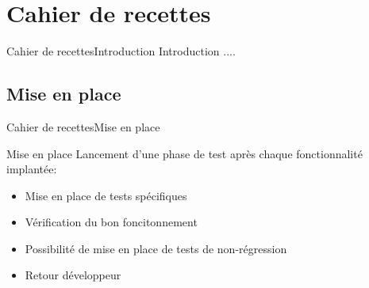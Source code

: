 \section{Cahier de recettes}
     \begin{frame}{Cahier de recettes}{Introduction}
        Introduction ....
     \end{frame}
   \subsection{Mise en place}
      \begin{frame}{Cahier de recettes}{Mise en place}
        \begin{block}{Mise en place}
          Lancement d'une phase de test après chaque fonctionnalité implantée:
          \begin{itemize}
            \item<1-> Mise en place de tests spécifiques
            \item<2-> Vérification du bon foncitonnement
            \item<3-> Possibilité de mise en place de tests de non-régression
            \item<4-> Retour développeur
          \end{itemize}
        \end{block}
      \end{frame}
